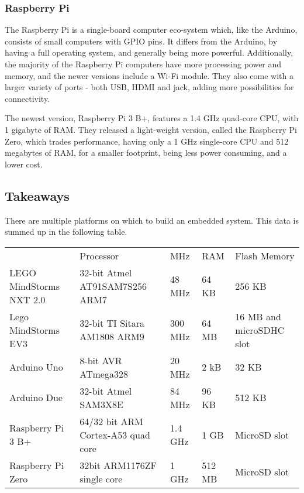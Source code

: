 \subsubsection{Raspberry Pi}
The Raspberry Pi is a single-board computer eco-system which, like the Arduino, consists of small computers with GPIO pins.
It differs from the Arduino, by having a full operating system, and generally being more powerful.
Additionally, the majority of the Raspberry Pi computers have more processing power and memory, and the newer versions include a Wi-Fi module.
They also come with a larger variety of ports - both USB, HDMI and jack, adding more possibilities for connectivity.


The newest version, Raspberry Pi 3 B+, features a 1.4 GHz quad-core CPU, with 1 gigabyte of RAM.
They released a light-weight version, called the Raspberry Pi Zero, which trades performance, having only a 1 GHz single-core CPU and 512 megabytes of RAM, for a smaller footprint, being less power consuming, and a lower cost.

\subsection{Takeaways}
There are multiple platforms on which to build an embedded system.
This data is summed up in the following table.

\begin{table}[]
	\begin{tabular}{lllll}
		                        & Processor                          & MHz     & RAM    & Flash Memory             \\
		LEGO MindStorms NXT 2.0 & 32-bit Atmel AT91SAM7S256 ARM7     & 48 MHz  & 64 KB  & 256 KB                   \\
		Lego MindStorms EV3     & 32-bit TI Sitara AM1808 ARM9       & 300 MHz & 64 MB  & 16 MB and microSDHC slot \\
		Arduino Uno             & 8-bit AVR ATmega328                & 20 MHz  & 2 kB   & 32 KB                    \\
		Arduino Due             & 32-bit Atmel SAM3X8E               & 84 MHz  & 96 KB  & 512 KB                   \\
		Raspberry Pi 3 B+       & 64/32 bit ARM Cortex-A53 quad core & 1.4 GHz & 1 GB   & MicroSD slot             \\
		Raspberry Pi Zero       & 32bit ARM1176ZF single core        & 1 GHz   & 512 MB & MicroSD slot
	\end{tabular}
\end{table}

